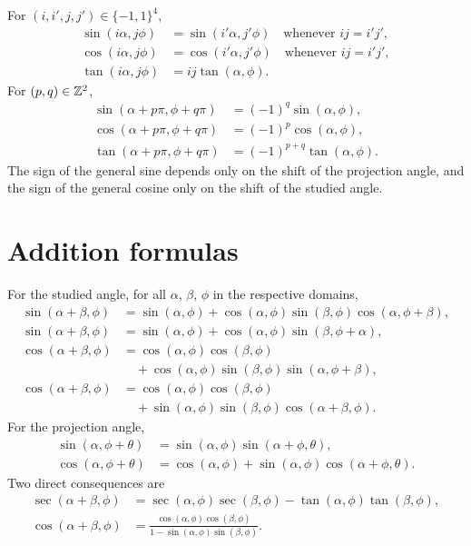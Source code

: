 For $(i, i', j, j') \in \{-1, 1\}^4$,
\begin{align}
\sin(i\alpha, j\phi) &= \sin(i'\alpha, j'\phi) \quad \text{whenever } ij = i'j', \\
\cos(i\alpha, j\phi) &= \cos(i'\alpha, j'\phi) \quad \text{whenever } ij = i'j', \\
\tan(i\alpha, j\phi) &= ij\tan(\alpha, \phi).
\end{align}
For $(p, q) \in \mathbb{Z}^2$,
\begin{align}
\sin(\alpha + p\pi, \phi + q\pi) &= (-1)^q \sin(\alpha, \phi), \\
\cos(\alpha + p\pi, \phi + q\pi) &= (-1)^p \cos(\alpha, \phi), \\
\tan(\alpha + p\pi, \phi + q\pi) &= (-1)^{p+q} \tan(\alpha, \phi).
\end{align}
The sign of the general sine depends only on the shift of the projection angle, and the sign of the general cosine only on the shift of the studied angle.

\section{Addition formulas}\label{app:gs-addition}

For the studied angle, for all $\alpha$, $\beta$, $\phi$ in the respective domains,
\begin{align}
\sin(\alpha + \beta, \phi) &= \sin(\alpha, \phi) + \cos(\alpha, \phi)\sin(\beta, \phi)\cos(\alpha, \phi + \beta), \\
\sin(\alpha + \beta, \phi) &= \sin(\alpha, \phi) + \cos(\alpha, \phi)\sin(\beta, \phi + \alpha), \\
\cos(\alpha + \beta, \phi) &= \cos(\alpha, \phi)\cos(\beta, \phi) \nonumber \\
&\quad + \cos(\alpha, \phi)\sin(\beta, \phi)\sin(\alpha, \phi + \beta), \\
\cos(\alpha + \beta, \phi) &= \cos(\alpha, \phi)\cos(\beta, \phi) \nonumber \\
&\quad + \sin(\alpha, \phi)\sin(\beta, \phi)\cos(\alpha + \beta, \phi).
\end{align}
For the projection angle,
\begin{align}
\sin(\alpha, \phi + \theta) &= \sin(\alpha, \phi)\sin(\alpha + \phi, \theta), \\
\cos(\alpha, \phi + \theta) &= \cos(\alpha, \phi) + \sin(\alpha, \phi)\cos(\alpha + \phi, \theta).
\end{align}
Two direct consequences are
\begin{align}
\sec(\alpha + \beta, \phi) &= \sec(\alpha, \phi)\sec(\beta, \phi) - \tan(\alpha, \phi)\tan(\beta, \phi), \\
\cos(\alpha + \beta, \phi) &= \frac{\cos(\alpha, \phi)\cos(\beta, \phi)}{1 - \sin(\alpha, \phi)\sin(\beta, \phi)} .
\end{align}

